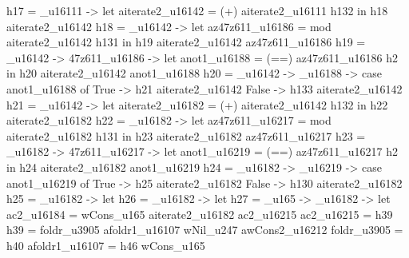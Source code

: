          h17 = _u16111 -> let
                                      aiterate2_u16142 = (+) aiterate2_u16111 h132
                                    in h18 aiterate2_u16142
         h18 = _u16142 -> let
                                      az47z611_u16186 = mod aiterate2_u16142 h131
                                    in h19 aiterate2_u16142 az47z611_u16186
         h19 = _u16142 -> \az47z611_u16186 -> let
                                                          anot1_u16188 = (==) az47z611_u16186 h2
                                                        in h20 aiterate2_u16142 anot1_u16188
         h20 = _u16142 -> _u16188 -> case anot1_u16188 of
                                                       True -> h21 aiterate2_u16142
                                                       False -> h133 aiterate2_u16142
         h21 = _u16142 -> let
                                      aiterate2_u16182 = (+) aiterate2_u16142 h132
                                    in h22 aiterate2_u16182
         h22 = _u16182 -> let
                                      az47z611_u16217 = mod aiterate2_u16182 h131
                                    in h23 aiterate2_u16182 az47z611_u16217
         h23 = _u16182 -> \az47z611_u16217 -> let
                                                          anot1_u16219 = (==) az47z611_u16217 h2
                                                        in h24 aiterate2_u16182 anot1_u16219
         h24 = _u16182 -> _u16219 -> case anot1_u16219 of
                                                       True -> h25 aiterate2_u16182
                                                       False -> h130 aiterate2_u16182
         h25 = _u16182 -> let
                                      h26 = _u16182 -> let
                                                                   h27 = \wCons_u165 -> _u16182 -> let
                                                                                                               ac2_u16184 = wCons_u165 aiterate2_u16182 ac2_u16215
                                                                                                               ac2_u16215 = h39
                                                                                                               h39 = foldr_u3905 afoldr1_u16107 wNil_u247 awCons2_u16212
                                                                                                               foldr_u3905 = h40
                                                                                                               afoldr1_u16107 = h46 wCons_u165
